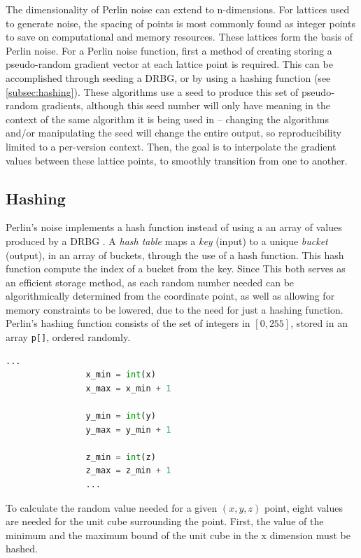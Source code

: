\documentclass[10pt]{report}
\begin{document}
		The dimensionality of Perlin noise can extend to n-dimensions. For lattices used to generate noise, the spacing of points is most commonly found as integer points to save on computational and memory resources. These lattices form the basis of Perlin noise. For a Perlin noise function, first a method of creating storing a pseudo-random gradient vector at each lattice point is required. This can be accomplished through seeding a DRBG, or by using a hashing function (see \autoref{subsec:hashing}). These algorithms use a seed to produce this set of pseudo-random gradients, although this seed number will only have meaning in the context of the same algorithm it is being used in -- changing the algorithms and/or manipulating the seed will change the entire output, so reproducibility limited to a per-version context. Then, the goal is to interpolate the gradient values between these lattice points, to smoothly transition from one to another. 
		
		
		\subsection{Hashing} \label{subsec:hashing}
			Perlin's noise implements a hash function instead of using a an array of values produced by a DRBG \cite{improv-noise}. A \emph{hash table} maps a \emph{key} (input) to a unique \emph{bucket} (output), in an array of buckets, through the use of a hash function. This hash function compute the index of a bucket from the key. Since  This both serves as an efficient storage method, as each random number needed can be algorithmically determined from the coordinate point, as well as allowing for memory constraints to be lowered, due to the need for just a hashing function. Perlin's hashing function consists of the set of integers in \([0, 255]\), stored in an array \lstinline|p[]|, ordered randomly. 
			
			\begin{lstlisting}[language=Python, frame=none, caption={Unit cube's corner minimum values}, captionpos=b]
				...
				x_min = int(x)
				x_max = x_min + 1
				
				y_min = int(y)
				y_max = y_min + 1
				
				z_min = int(z)
				z_max = z_min + 1
				...
			\end{lstlisting}
			
			To calculate the random value needed for a given \((x,y,z)\) point, eight values are needed for the unit cube surrounding the point. First, the value of the minimum and the maximum bound of the unit cube in the x dimension must be hashed. 
			
\end{document}
